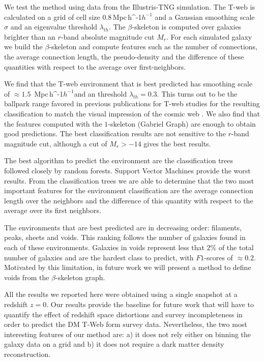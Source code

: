 \documentclass[usenatbib]{mnras}
\newcommand{\Mpch}{\,{\rm Mpc}\,\ifmmode h^{-1}\else $h^{-1}$\fi}
\begin{document}
We test the method using data from the Illustris-TNG simulation.
The T-web is calculated on a grid of cell size $0.8$\Mpch 
and a Gaussian smoothing scale $\sigma$ and an eigenvalue threshold $\lambda_{th}$.
The $\beta$-skeleton is computed over galaxies brighter than 
an $r$-band absolute magnitude cut $M_{r}$.
For each simulated galaxy we build the $\beta$-skeleton and
compute features such as the number of connections, the average connection
length, the pseudo-density and the difference of these quantities with
respect to the average over first-neighbors.

We find that the T-web environment that is best predicted has smoothing
scale of $\approx1.5$ \Mpch and an threshold $\lambda_{th}=0.3$. 
This turns out to be the ballpark range  favored in previous publications
for T-web  studies for the resulting classification to match the visual impression of the cosmic web \citep{2009Forero-Romero}.
We also find that the features computed with the $1$-skeleton 
(Gabriel Graph) are enough to obtain good predictions. 
The best classification results are not sensitive to the $r$-band
magnitude cut, although a cut of $M_r>-14$ gives the best results.

The best algorithm to predict the environment are the classification
trees followed closely by random forests. 
Support Vector Machines provide the worst results.
From the classification trees we are able to determine that the two most
important features for the environment classification are the average
connection length over the neighbors and the difference of this quantity
with respect to the average over its first neighbors.

The environments that are best predicted are in decreasing order: 
filaments, peaks, sheets and voids. 
This ranking follows the number of galaxies found in each of these environments.
Galaxies in voids represent less that $2\%$ of the total number of galaxies and 
are the hardest class to predict, with $F1$-scores of $\approx0.2$.
Motivated by this limitation, in future work we will present a method to define
voids from the $\beta$-skeleton graph.

All the results we reported here were obtained using a single snapshot at a 
redshift $z=0$.
Our results provide the baseline for future work that will have to quantify 
the effect of redshift space distortions and survey incompleteness in order to
predict  the DM T-Web form survey data.
Nevertheless, the two most interesting features of our method are: a) it does not
rely either on binning the galaxy data on a grid and b) it does not require 
a dark matter density reconstruction.
\end{document}
